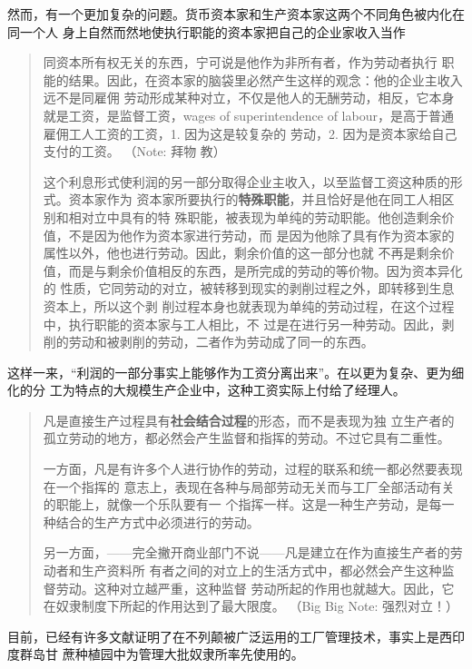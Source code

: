 然而，有一个更加复杂的问题。货币资本家和生产资本家这两个不同角色被内化在同一个人
身上自然而然地使执行职能的资本家把自己的企业家收入当作
\begin{quotation}同资本所有权无关的东西，宁可说是他作为非所有者，作为劳动者执行
职能的结果。因此，在资本家的脑袋里必然产生这样的观念：他的企业主收入远不是同雇佣
劳动形成某种对立，不仅是他人的无酬劳动，相反，它本身就是工资，是监督工资，wages
of superintendence of labour，是高于普通雇佣工人工资的工资，1. 因为这是较复杂的
劳动，2. 因为是资本家给自己支付的工资。 （Note: 拜物
教）

这个利息形式使利润的另一部分取得企业主收入，以至监督工资这种质的形式。资本家作为
资本家所要执行的\textbf{特殊职能}，并且恰好是他在同工人相区别和相对立中具有的特
殊职能，被表现为单纯的劳动职能。他创造剩余价值，不是因为他作为资本家进行劳动，而
是因为他除了具有作为资本家的属性以外，他也进行劳动。因此，剩余价值的这一部分也就
不再是剩余价值，而是与剩余价值相反的东西，是所完成的劳动的等价物。因为资本异化的
性质，它同劳动的对立，被转移到现实的剥削过程之外，即转移到生息资本上，所以这个剥
削过程本身也就表现为单纯的劳动过程，在这个过程中，执行职能的资本家与工人相比，不
过是在进行另一种劳动。因此，剥削的劳动和被剥削的劳动，二者作为劳动成了同一的东西。

\end{quotation}

这样一来，“利润的一部分事实上能够作为工资分离出来”。在以更为复杂、更为细化的分
工为特点的大规模生产企业中，这种工资实际上付给了经理人。

\begin{quotation}凡是直接生产过程具有\textbf{社会结合过程}的形态，而不是表现为独
立生产者的孤立劳动的地方，都必然会产生监督和指挥的劳动。不过它具有二重性。

  一方面，凡是有许多个人进行协作的劳动，过程的联系和统一都必然要表现在一个指挥的
意志上，表现在各种与局部劳动无关而与工厂全部活动有关的职能上，就像一个乐队要有一
个指挥一样。这是一种生产劳动，是每一种结合的生产方式中必须进行的劳动。

  另一方面，——完全撇开商业部门不说——凡是建立在作为直接生产者的劳动者和生产资料所
有者之间的对立上的生活方式中，都必然会产生这种监督劳动。这种对立越严重，这种监督
劳动所起的作用也就越大。因此，它在奴隶制度下所起的作用达到了最大限度。
（Big Big Note: 强烈对立！）
\end{quotation}

目前，已经有许多文献证明了在不列颠被广泛运用的工厂管理技术，事实上是西印度群岛甘
蔗种植园中为管理大批奴隶所率先使用的。

